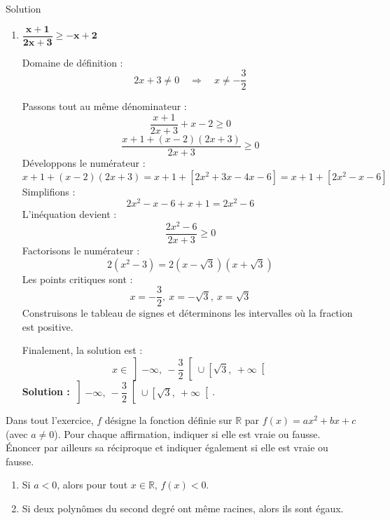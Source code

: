 \documentclass[a4paper,12pt]{article}
\begin{document}
\begin{solutionbox}{Solution}
\begin{enumerate}
    Sans détailler tout le tableau, nous obtenons que la fraction est négative sur les intervalles :
    \[
    \left]-\infty,\ -\sqrt{3}\right[ \quad \text{et} \quad \left]1 - \sqrt{6},\ \sqrt{3}\right]
    \]
    \textbf{Solution :} \( \left]-\infty,\ -\sqrt{3}\right[ \cup \left]1 - \sqrt{6},\ \sqrt{3}\right[ \).

    \item \(\boldsymbol{\dfrac{x + 1}{2x + 3} \geq -x + 2}\)

    Domaine de définition :
    \[
    2x + 3 \neq 0 \quad \Rightarrow \quad x \neq -\dfrac{3}{2}
    \]

    Passons tout au même dénominateur :
    \[
    \dfrac{x + 1}{2x + 3} + x - 2 \geq 0
    \]
    \[
    \dfrac{x + 1 + (x - 2)(2x + 3)}{2x + 3} \geq 0
    \]
    Développons le numérateur :
    \[
    x + 1 + (x - 2)(2x + 3) = x + 1 + [2x^2 + 3x - 4x - 6] = x + 1 + [2x^2 - x - 6]
    \]
    Simplifions :
    \[
    2x^2 - x - 6 + x + 1 = 2x^2 - 6
    \]
    L'inéquation devient :
    \[
    \dfrac{2x^2 - 6}{2x + 3} \geq 0
    \]
    Factorisons le numérateur :
    \[
    2(x^2 - 3) = 2(x - \sqrt{3})(x + \sqrt{3})
    \]
    Les points critiques sont :
    \[
    x = -\dfrac{3}{2},\ x = -\sqrt{3},\ x = \sqrt{3}
    \]
    Construisons le tableau de signes et déterminons les intervalles où la fraction est positive.

    Finalement, la solution est :
    \[
    x \in \left]-\infty,\ -\dfrac{3}{2}\right[ \cup \left[\sqrt{3},\ +\infty\right[
    \]
    \textbf{Solution :} \( \left]-\infty,\ -\dfrac{3}{2}\right[ \cup \left[\sqrt{3},\ +\infty\right[ \).

\end{enumerate}
\end{solutionbox}

\begin{exercice}[title=Exercice 16 \quad$\star$\quad\  {[Raisonner]}]{}{}
Dans tout l’exercice, \(f\) désigne la fonction définie sur \( \mathbb{R} \) par \( f(x) = ax^2 + bx + c \) (avec \( a \neq 0 \)). Pour chaque affirmation, indiquer si elle est vraie ou fausse. Énoncer par ailleurs sa réciproque et indiquer également si elle est vraie ou fausse.
\begin{enumerate}
    \item Si \(a < 0\), alors pour tout \( x \in \mathbb{R} \), \(f(x) < 0\).
    \item Si deux polynômes du second degré ont même racines, alors ils sont égaux.
\end{enumerate}
\end{exercice}
\end{document}
